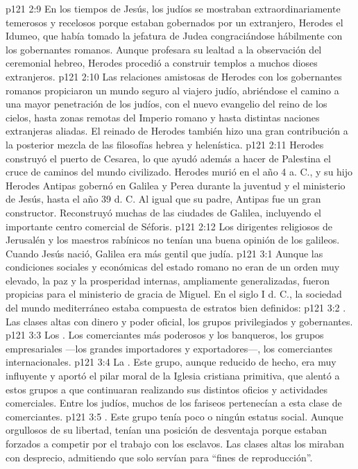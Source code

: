 \vs p121 2:9 \pc En los tiempos de Jesús, los judíos se mostraban extraordinariamente temerosos y recelosos porque estaban gobernados por un extranjero, Herodes el Idumeo, que había tomado la jefatura de Judea congraciándose hábilmente con los gobernantes romanos. Aunque profesara su lealtad a la observación del ceremonial hebreo, Herodes procedió a construir templos a muchos dioses extranjeros.
\vs p121 2:10 Las relaciones amistosas de Herodes con los gobernantes romanos propiciaron un mundo seguro al viajero judío, abriéndose el camino a una mayor penetración de los judíos, con el nuevo evangelio del reino de los cielos, hasta zonas remotas del Imperio romano y hasta distintas naciones extranjeras aliadas. El reinado de Herodes también hizo una gran contribución a la posterior mezcla de las filosofías hebrea y helenística.
\vs p121 2:11 Herodes construyó el puerto de Cesarea, lo que ayudó además a hacer de Palestina el cruce de caminos del mundo civilizado. Herodes murió en el año 4 a. C., y su hijo Herodes Antipas gobernó en Galilea y Perea durante la juventud y el ministerio de Jesús, hasta el año 39 d. C. Al igual que su padre, Antipas fue un gran constructor. Reconstruyó muchas de las ciudades de Galilea, incluyendo el importante centro comercial de Séforis.
\vs p121 2:12 Los dirigentes religiosos de Jerusalén y los maestros rabínicos no tenían una buena opinión de los galileos. Cuando Jesús nació, Galilea era más gentil que judía.
\vs p121 3:1 Aunque las condiciones sociales y económicas del estado romano no eran de un orden muy elevado, la paz y la prosperidad internas, ampliamente generalizadas, fueron propicias para el ministerio de gracia de Miguel. En el siglo I d. C., la sociedad del mundo mediterráneo estaba compuesta de estratos bien definidos:
\vs p121 3:2 . Las clases altas con dinero y poder oficial, los grupos privilegiados y gobernantes.
\vs p121 3:3 Los . Los comerciantes más poderosos y los banqueros, los grupos empresariales ---los grandes importadores y exportadores---, los comerciantes internacionales.
\vs p121 3:4 La . Este grupo, aunque reducido de hecho, era muy influyente y aportó el pilar moral de la Iglesia cristiana primitiva, que alentó a estos grupos a que continuaran realizando sus distintos oficios y actividades comerciales. Entre los judíos, muchos de los fariseos pertenecían a esta clase de comerciantes.
\vs p121 3:5 . Este grupo tenía poco o ningún estatus social. Aunque orgullosos de su libertad, tenían una posición de desventaja porque estaban forzados a competir por el trabajo con los esclavos. Las clases altas los miraban con desprecio, admitiendo que solo servían para “fines de reproducción”.
